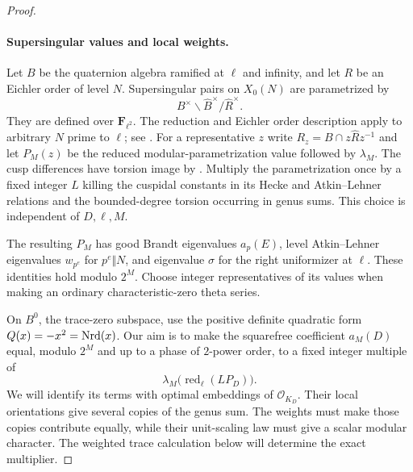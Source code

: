 \begin{proof}
\paragraph{Supersingular values and local weights.}
Let $B$ be the quaternion algebra ramified at $\ell$ and infinity, and
let $R$ be an Eichler order of level $N$.  Supersingular pairs on $X_0(N)$
are parametrized by
\[
                  B^\times\backslash\widehat B^\times/
                  \widehat R^\times.
\]
They are defined over $\mathbf F_{\ell^2}$.  The reduction and Eichler
order description apply to arbitrary $N$ prime to $\ell$; see
\citep[Sections~1.1--1.2 and~2.5]{JetchevKane2011}.
For a representative $z$ write $R_z=B\cap z\widehat Rz^{-1}$ and let
$P_M(z)$ be the reduced modular-parametrization value followed by
$\lambda_M$.  The cusp differences have torsion image by
\citet[Section~1]{Drinfeld1973}.  Multiply the parametrization once by a fixed integer
$L$ killing the cuspidal constants in its Hecke and Atkin--Lehner
relations and the bounded-degree torsion occurring in genus sums.
This choice is independent of $D,\ell,M$.

The resulting $P_M$ has good Brandt eigenvalues $a_p(E)$, level
Atkin--Lehner eigenvalues $w_{p^e}$ for $p^e\Vert N$, and eigenvalue
$\sigma$ for the right uniformizer at $\ell$.  These identities hold
modulo $2^M$.  Choose integer representatives of its values when making
an ordinary characteristic-zero theta series.

On $B^0$, the trace-zero subspace, use the positive definite quadratic
form $Q(x)=-x^2=\operatorname{Nrd}(x)$. Our aim is to make the squarefree coefficient
$a_M(D)$ equal, modulo $2^M$ and up to a phase of $2$-power order, to a
fixed integer multiple of
\[
                 \lambda_M\bigl(\operatorname{red}_{\ell}(L P_D)\bigr).
\]
We will identify its terms with optimal embeddings of
$\mathcal O_{K_D}$. Their local orientations give several copies of the genus sum.
The weights must make those copies contribute equally, while their
unit-scaling law must give a scalar modular character. The weighted
trace calculation below will determine the exact multiplier.


\end{proof}
